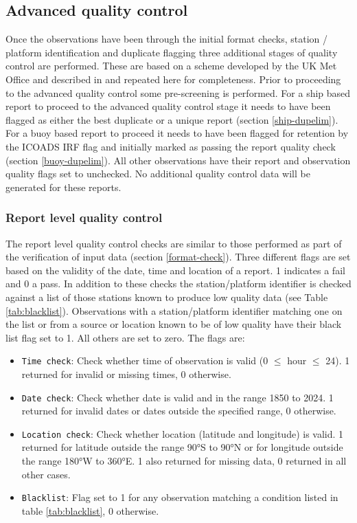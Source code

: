 \subsection{Advanced quality control}
Once the observations have been through the initial format checks, station / platform identification and duplicate flagging three additional stages of quality control are performed. 
These are based on a scheme developed by the UK Met Office and described in \cite{Kennedy2019} and repeated here for completeness.
Prior to proceeding to the advanced quality control some pre-screening is performed.
For a ship based report to proceed to the advanced quality control stage it needs to have been flagged as either the best duplicate or a unique report (section \ref{ship-dupelim}).
For a buoy based report to proceed it needs to have been flagged for retention by the ICOADS IRF flag and initially marked as passing the report quality check (section \ref{buoy-dupelim}).
All other observations have their report and observation quality flags set to unchecked. No additional quality control data will be generated for these reports.
\FloatBarrier
\subsubsection{Report level quality control} \label{report-qc}
The report level quality control checks are similar to those performed as part of the verification of input data (section \ref{format-check}).
Three different flags are set based on the validity of the date, time and location of a report. 1 indicates a fail and 0 a pass.
In addition to these checks the station/platform identifier is checked against a list of those stations known to produce low quality data (see Table \ref{tab:blacklist}). 
Observations with a station/platform identifier matching one on the list or from a source or location known to be of low quality have their black list flag set to 1. All others are set to zero.
The flags are:
\begin{itemize}
\item \texttt{Time check}: Check whether time of observation is valid (0 $\leq$ hour $\leq$ 24). 1 returned for invalid or missing times, 0 otherwise.
\item \texttt{Date check}: Check whether date is valid and in the range 1850 to 2024. 1 returned for invalid dates or dates outside the specified range, 0 otherwise.
\item \texttt{Location check}: Check whether location (latitude and longitude) is valid. 1 returned for latitude outside the range 90°S to 90°N or for longitude outside the range 180°W to 360°E. 1 also returned for missing data, 0 returned in all other cases.
\item \texttt{Blacklist}: Flag set to 1 for any observation matching a condition listed in table \ref{tab:blacklist}, 0 otherwise.
\end{itemize}

